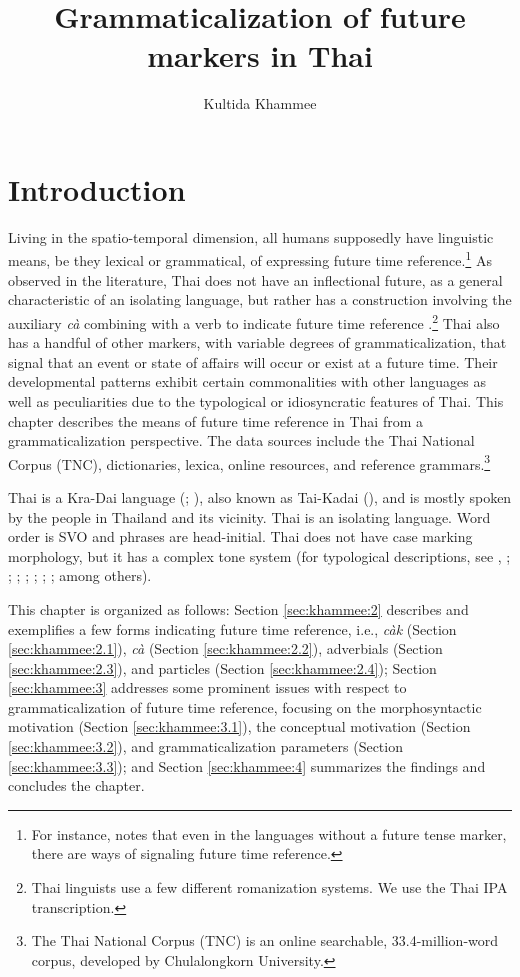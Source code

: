 \documentclass[output=paper,colorlinks,citecolor=brown]{langscibook}
\author{Kultida Khammee\orcid{}\affiliation{University of Phayao}}
\title{Grammaticalization of future markers in Thai}
\begin{document}
\maketitle


\section{Introduction}

Living in the spatio-temporal dimension, all humans supposedly have linguistic means, be they lexical or grammatical, of expressing future time reference.\footnote{For instance, \citet[108--109]{Dahl1985} notes that even in the languages without a future tense marker, there are ways of signaling future time reference.} As observed in the literature, Thai does not have an inflectional future, as a general characteristic of an isolating language, but rather has a construction involving the auxiliary \textit{cà} combining with a verb to indicate future time reference \citep[173--174]{Dahl1985}.\footnote{Thai linguists use a few different romanization systems. We use the Thai IPA transcription.} Thai also has a handful of other markers, with variable degrees of grammaticalization, that signal that an event or state of affairs will occur or exist at a future time. Their developmental patterns exhibit certain commonalities with other languages as well as peculiarities due to the typological or idiosyncratic features of Thai. This chapter describes the means of future time reference in Thai from a grammaticalization perspective. The data sources include the Thai National Corpus (TNC), dictionaries, lexica, online resources, and reference grammars.\footnote{The Thai National Corpus (TNC) is an online searchable, 33.4-million-word corpus, developed by Chulalongkorn University.}

Thai is a Kra-Dai language (\cite{Ostapirat2000}; \cite{Eberhard2022}), also known as Tai-Kadai (\cite{DillerEdmondsonLuo2008}), and is mostly spoken by the people in Thailand and its vicinity. Thai is an isolating language. Word order is SVO and phrases are head-initial. Thai does not have case marking morphology, but it has a complex tone system (for typological descriptions, see \cite{Noss1954}, \citeyear{Noss1964}; \cite{abramson1962}; \cite{Haas1964}; \cite{anthony1968}; \cite{Warotamasikkhadit1972}; \cite{TingsabadhAbramson1999}; \cite{Campbell2000}; among others). 


This chapter is organized as follows: Section \ref{sec:khammee:2} describes and exemplifies a few forms indicating future time reference, i.e., \textit{càk} (Section \ref{sec:khammee:2.1}), \textit{cà} (Section \ref{sec:khammee:2.2}), adverbials (Section \ref{sec:khammee:2.3}), and particles (Section \ref{sec:khammee:2.4}); Section \ref{sec:khammee:3} addresses some prominent issues with respect to grammaticalization of future time reference, focusing on the morphosyntactic motivation (Section \ref{sec:khammee:3.1}), the conceptual motivation (Section \ref{sec:khammee:3.2}), and grammaticalization parameters (Section \ref{sec:khammee:3.3}); and Section \ref{sec:khammee:4} summarizes the findings and concludes the chapter. 
\end{document}
